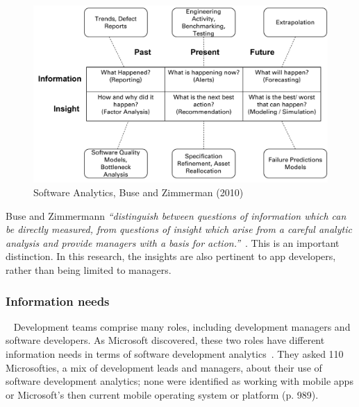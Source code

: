 \begin{figure}
    \centering
    \includegraphics[width=\linewidth]{images/related-work/buse_and_zimmermann_2010_figure_a.pdf}
    \caption{Software Analytics, Buse and Zimmerman (2010)}
    \label{fig:software_analytics_buse_and_zimmerman_2010}
\end{figure}


Buse and Zimmermann  \emph{``distinguish between questions of information which can be directly measured, from questions of insight which arise from a careful analytic analysis and provide managers with a basis for action.''}~. This is an important distinction. In this research, the insights  are also pertinent to app developers, rather than being limited to managers.

\subsubsection{Information needs}~\label{rw-information-needs-research}
Development teams comprise many roles, including development managers and software developers. As Microsoft discovered, these two roles have different information needs in terms of software development analytics~. They asked 110 Microsofties, a mix of development leads and managers, about their use of software development analytics; none were identified as working with mobile apps or Microsoft's then current mobile operating system or platform (p. 989). 

